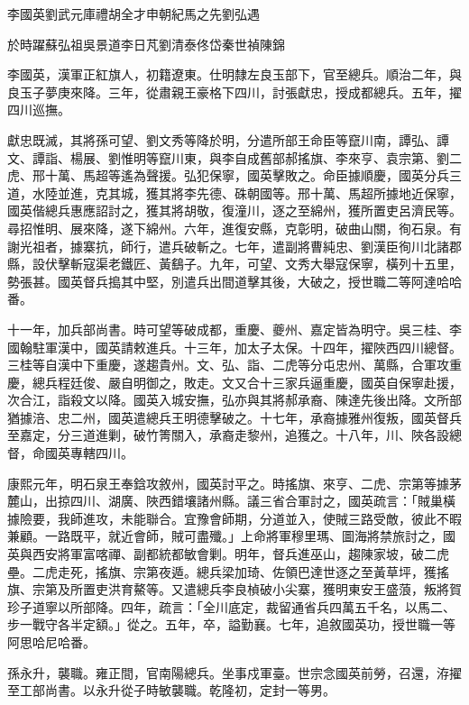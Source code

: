
\begin{pinyinscope}
李國英劉武元庫禮胡全才申朝紀馬之先劉弘遇

於時躍蘇弘祖吳景道李日芃劉清泰佟岱秦世禎陳錦

李國英，漢軍正紅旗人，初籍遼東。仕明隸左良玉部下，官至總兵。順治二年，與良玉子夢庚來降。三年，從肅親王豪格下四川，討張獻忠，授成都總兵。五年，擢四川巡撫。

獻忠既滅，其將孫可望、劉文秀等降於明，分遣所部王命臣等竄川南，譚弘、譚文、譚詣、楊展、劉惟明等竄川東，與李自成舊部郝搖旗、李來亨、袁宗第、劉二虎、邢十萬、馬超等遙為聲援。弘犯保寧，國英擊敗之。命臣據順慶，國英分兵三道，水陸並進，克其城，獲其將李先德、硃朝國等。邢十萬、馬超所據地近保寧，國英偕總兵惠應詔討之，獲其將胡敬，復潼川，逐之至綿州，獲所置吏呂濟民等。尋招惟明、展來降，遂下綿州。六年，進復安縣，克彰明，破曲山關，徇石泉。有謝光祖者，據寨抗，師行，遣兵破斬之。七年，遣副將曹純忠、劉漢臣徇川北諸郡縣，設伏擊斬寇渠老鐵匠、黃鷂子。九年，可望、文秀大舉寇保寧，橫列十五里，勢張甚。國英督兵搗其中堅，別遣兵出間道擊其後，大破之，授世職二等阿達哈哈番。

十一年，加兵部尚書。時可望等破成都，重慶、夔州、嘉定皆為明守。吳三桂、李國翰駐軍漢中，國英請敕進兵。十三年，加太子太保。十四年，擢陜西四川總督。三桂等自漢中下重慶，遂趨貴州。文、弘、詣、二虎等分屯忠州、萬縣，合軍攻重慶，總兵程廷俊、嚴自明御之，敗走。文又合十三家兵逼重慶，國英自保寧赴援，次合江，詣殺文以降。國英入城安撫，弘亦與其將郝承裔、陳達先後出降。文所部猶據涪、忠二州，國英遣總兵王明德擊破之。十七年，承裔據雅州復叛，國英督兵至嘉定，分三道進剿，破竹箐關入，承裔走黎州，追獲之。十八年，川、陜各設總督，命國英專轄四川。

康熙元年，明石泉王奉鋡攻敘州，國英討平之。時搖旗、來亨、二虎、宗第等據茅麓山，出掠四川、湖廣、陜西錯壤諸州縣。議三省合軍討之，國英疏言：「賊巢橫據險要，我師進攻，未能聯合。宜豫會師期，分道並入，使賊三路受敵，彼此不暇兼顧。一路既平，就近會師，賊可盡殲。」上命將軍穆里瑪、圖海將禁旅討之，國英與西安將軍富喀禪、副都統都敏會剿。明年，督兵進巫山，趨陳家坡，破二虎壘。二虎走死，搖旗、宗第夜遁。總兵梁加琦、佐領巴達世逐之至黃草坪，獲搖旗、宗第及所置吏洪育鰲等。又遣總兵李良楨破小尖寨，獲明東安王盛蒗，叛將賀珍子道寧以所部降。四年，疏言：「全川底定，裁留通省兵四萬五千名，以馬二、步一戰守各半定額。」從之。五年，卒，謚勤襄。七年，追敘國英功，授世職一等阿思哈尼哈番。

孫永升，襲職。雍正間，官南陽總兵。坐事戍軍臺。世宗念國英前勞，召還，洊擢至工部尚書。以永升從子時敏襲職。乾隆初，定封一等男。


\end{pinyinscope}
